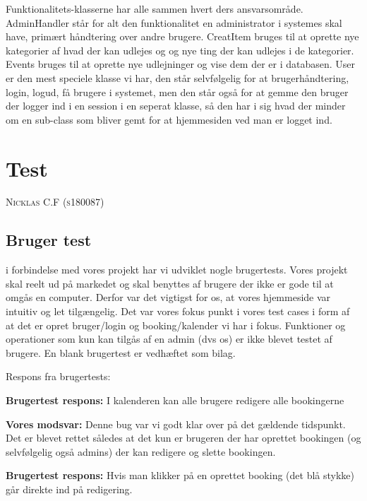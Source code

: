 \documentclass[12pt,a4paper]{report} %
\makeatletter
\newcommand\chapterauthor[1]{\authortoc{#1}\printchapterauthor{#1}}
\newcommand{\printchapterauthor}[1]{%
  {\parindent0pt\vspace*{-25pt}%
  \linespread{1.1}\large\scshape#1%
  \par\nobreak\vspace*{35pt}}
  \@afterheading%
}
\newcommand{\authortoc}[1]{%
  \addtocontents{toc}{\vskip-10pt}%
  \addtocontents{toc}{%
    \protect\contentsline{chapter}%
    {\hskip1.3em\mdseries\scshape\protect\scriptsize#1}{}{}}
  \addtocontents{toc}{\vskip5pt}%
}
\makeatother
\begin{document}
        \noindent Funktionalitets-klasserne har alle sammen hvert ders ansvarsområde.\newline
        AdminHandler står for alt den funktionalitet en administrator i systemes skal have, primært håndtering over andre brugere.\newline
        CreatItem bruges til at oprette nye kategorier af hvad der kan udlejes og og nye ting der kan udlejes i de kategorier.\newline
        Events bruges til at oprette nye udlejninger og vise dem der er i databasen.\newline
        User er den mest speciele klasse vi har, den står selvfølgelig for at brugerhåndtering, login, logud, få brugere i systemet, men den står også for at gemme den bruger der logger ind i en session i en seperat klasse, så den har i sig hvad der minder om en sub-class som bliver gemt for at hjemmesiden ved man er logget ind.
    
    \chapter{Test}
    \chapterauthor{Nicklas C.F (s180087)}
    
    \section{Bruger test}
    i forbindelse med vores projekt har vi udviklet nogle brugertests. Vores projekt skal reelt ud på markedet og skal benyttes af brugere der ikke er gode til at omgås en computer. Derfor var det vigtigst for os, at vores hjemmeside var intuitiv og let tilgængelig. Det var vores fokus punkt i vores test cases i form af at det er opret bruger/login og booking/kalender vi har i fokus. Funktioner og operationer som kun kan tilgås af en admin (dvs os) er ikke blevet testet af brugere.
    En blank brugertest er vedhæftet som bilag.
    
    Respons fra brugertests:
    

\noindent\textbf{Brugertest respons:} I kalenderen kan alle brugere redigere alle bookingerne

\noindent\textbf{Vores modsvar:} Denne bug var vi godt klar over på det gældende tidspunkt. Det er blevet rettet således at det kun er brugeren der har oprettet bookingen (og selvfølgelig også admins) der kan redigere og slette bookingen.

\noindent\textbf{Brugertest respons:} Hvis man klikker på en oprettet booking (det blå stykke) går direkte ind på redigering.
\end{document}
